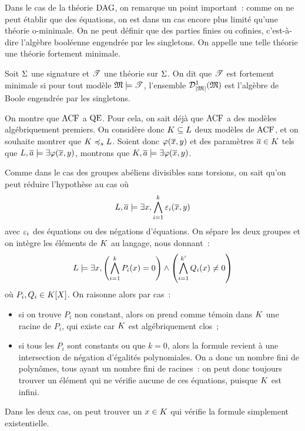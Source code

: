 Dans le cas de la théorie $\operatorname{DAG}$, on remarque un point important~: comme on ne
peut établir que des équations, on est dans un cas encore plus limité qu'une
théorie o-minimale. On ne peut définir que des parties finies ou cofinies,
c'est-à-dire l'algèbre booléenne engendrée par les singletons. On appelle une
telle théorie une théorie fortement minimale.

\begin{definition}
  Soit $\Sigma$ une signature et $\mathscr T$ une théorie sur $\Sigma$. On dit que
  $\mathscr T$ est fortement minimale si pour tout modèle $\mathfrak{M}\models\mathscr T$,
  l'ensemble $\mathcal{D}^{1}_{\left\vert \mathfrak{M}\right\vert}(\mathfrak{M})$ est l'algèbre de Boole engendrée
  par les singletons.
\end{definition}

\begin{example}
  On montre que $\operatorname{ACF}$ a $\operatorname{QE}$. Pour cela, on sait déjà que $\operatorname{ACF}$ a des modèles
  algébriquement premiers. On considère donc $K\subseteq L$ deux
  modèles de $\operatorname{ACF}$, et on souhaite montrer que $K\preccurlyeq_{s}L$. Soient
  donc $\varphi(\overline{x},y)$ et des paramètres $\overline{a}\in K$ tels que
  $L,\overline{a} \models\exists \varphi(\overline{x},y)$, montrons que
  $K,\overline{a}\models\exists \varphi(\overline{x},y)$.

  Comme dans le cas des groupes abéliens divisibles sans torsions, on sait
  qu'on peut réduire l'hypothèse au cas où
  \[L,\overline{a} \models\exists x, \bigwedge_{i = 1}^k \varepsilon_i(\overline{x},y)\]
  avec $\varepsilon_i$ des équations ou des négations d'équations. On sépare les
  deux groupes et on intègre les éléments de $K$ au langage, nous donnant~:
  \[L\models\exists x,
  \left(\bigwedge_{i = 1}^k P_i(x) = 0\right)\land
  \left(\bigwedge_{i = 1}^{k'}Q_i(x) \neq 0\right)\]
  où $P_i,Q_i \in K[X]$. On raisonne alors par cas~:
  \begin{itemize}
  \item si on trouve $P_i$ non constant, alors on prend comme témoin dans
    $K$ une racine de $P_i$, qui existe car $K$ est algébriquement
    clos~;
  \item si tous les $P_i$ sont constants ou que $k = 0$, alors la formule
    revient à une intersection de négation d'égalités polynomiales. On a donc
    un nombre fini de polynômes, tous ayant un nombre fini de racines~: on peut
    donc toujours trouver un élément qui ne vérifie aucune de ces équations,
    puisque $K$ est infini.
  \end{itemize}
  Dans les deux cas, on peut trouver un $x\in K$ qui vérifie la formule
  simplement existentielle.
\end{example}

